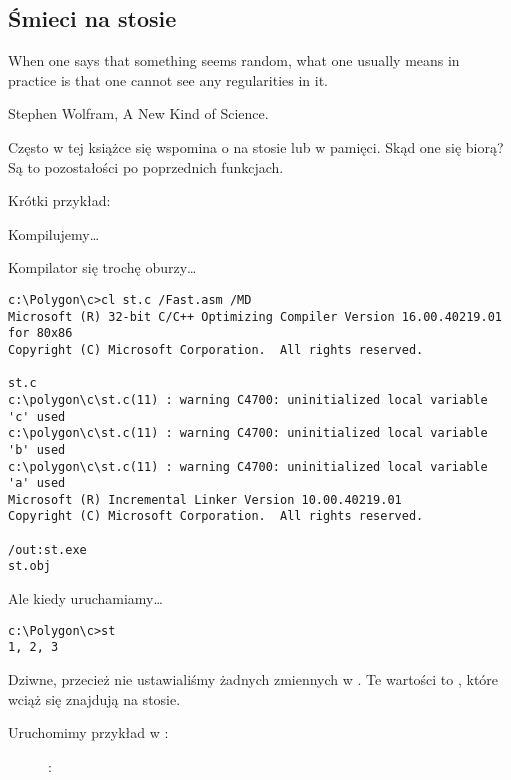 \subsection{Śmieci na stosie}
\label{noise_in_stack}

\epigraph{When one says that something seems random, what one usually
means in practice is that one cannot see any regularities in it.}{Stephen Wolfram, A New Kind of Science.}

Często w tej książce się wspomina o  na stosie lub w pamięci.
Skąd one się biorą?
Są to pozostałości po poprzednich funkcjach.

Krótki przykład:



Kompilujemy\dots



Kompilator się trochę oburzy\dots

\begin{lstlisting}
c:\Polygon\c>cl st.c /Fast.asm /MD
Microsoft (R) 32-bit C/C++ Optimizing Compiler Version 16.00.40219.01 for 80x86
Copyright (C) Microsoft Corporation.  All rights reserved.

st.c
c:\polygon\c\st.c(11) : warning C4700: uninitialized local variable 'c' used
c:\polygon\c\st.c(11) : warning C4700: uninitialized local variable 'b' used
c:\polygon\c\st.c(11) : warning C4700: uninitialized local variable 'a' used
Microsoft (R) Incremental Linker Version 10.00.40219.01
Copyright (C) Microsoft Corporation.  All rights reserved.

/out:st.exe
st.obj
\end{lstlisting}

Ale kiedy uruchamiamy\dots

\begin{lstlisting}
c:\Polygon\c>st
1, 2, 3
\end{lstlisting}

Dziwne, przecież nie ustawialiśmy żadnych zmiennych w . 
Te wartości to , które wciąż się znajdują na stosie.

\clearpage
Uruchomimy przykład w \olly:

\begin{figure}[H]
\centering
{}
\caption{\olly: }
\label{fig:stack_noise_olly1}
\end{figure}

